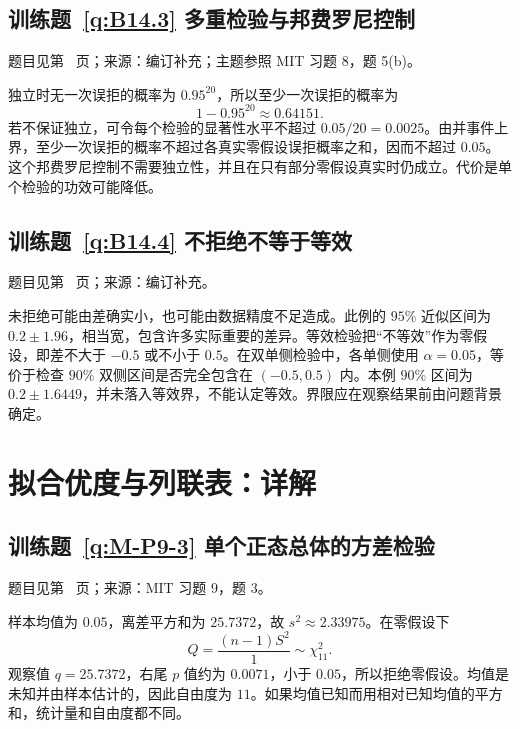 \subsection*{训练题~\ref{q:B14.3} 多重检验与邦费罗尼控制}\label{a:B14.3}{\small 题目见第~\pageref{q:B14.3} 页；来源：编订补充；主题参照 MIT 习题 8，题 5(b)。}
\begin{solve}独立时无一次误拒的概率为 $0.95^{20}$，所以至少一次误拒的概率为\[1-0.95^{20}\approx0.64151.\]若不保证独立，可令每个检验的显著性水平不超过 $0.05/20=0.0025$。由并事件上界，至少一次误拒的概率不超过各真实零假设误拒概率之和，因而不超过 $0.05$。这个邦费罗尼控制不需要独立性，并且在只有部分零假设真实时仍成立。代价是单个检验的功效可能降低。\end{solve}

\subsection*{训练题~\ref{q:B14.4} 不拒绝不等于等效}\label{a:B14.4}{\small 题目见第~\pageref{q:B14.4} 页；来源：编订补充。}
\begin{solve}未拒绝可能由差确实小，也可能由数据精度不足造成。此例的 $95\%$ 近似区间为 $0.2\pm1.96$，相当宽，包含许多实际重要的差异。等效检验把“不等效”作为零假设，即差不大于 $-0.5$ 或不小于 $0.5$。在双单侧检验中，各单侧使用 $\alpha=0.05$，等价于检查 $90\%$ 双侧区间是否完全包含在 $(-0.5,0.5)$ 内。本例 $90\%$ 区间为 $0.2\pm1.6449$，并未落入等效界，不能认定等效。界限应在观察结果前由问题背景确定。\end{solve}

\clearpage\section*{拟合优度与列联表：详解}

\subsection*{训练题~\ref{q:M-P9-3} 单个正态总体的方差检验}\label{a:M-P9-3}{\small 题目见第~\pageref{q:M-P9-3} 页；来源：MIT 习题 9，题 3。}
\begin{solve}样本均值为 $0.05$，离差平方和为 $25.7372$，故 $s^2\approx2.33975$。在零假设下\[Q=\frac{(n-1)S^2}{1}\sim\chi^2_{11}.\]观察值 $q=25.7372$，右尾 $p$ 值约为 $0.0071$，小于 $0.05$，所以拒绝零假设。均值是未知并由样本估计的，因此自由度为 $11$。如果均值已知而用相对已知均值的平方和，统计量和自由度都不同。\end{solve}

